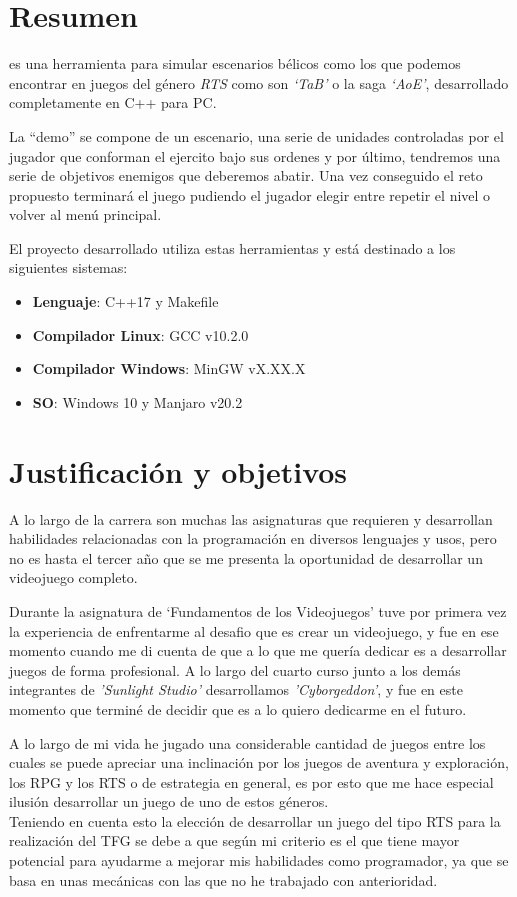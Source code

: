 \chapter*{Resumen}
\label{Resumen}

 es una herramienta para simular escenarios 
bélicos como los que podemos encontrar en juegos del género \textit{\ac{RTS}} como son
\textit{`\ac{TaB}'} o la saga \textit{`\ac{AoE}'}, desarrollado
completamente en C++ para \ac{PC}.

La ``demo'' se compone de un escenario, una serie de unidades controladas por el jugador
que conforman el ejercito bajo sus ordenes y por último, tendremos una serie de objetivos enemigos
que deberemos abatir. Una vez conseguido el reto propuesto terminará el juego pudiendo el jugador elegir 
entre repetir el nivel o volver al menú principal.

El proyecto desarrollado utiliza estas herramientas y está destinado a los siguientes
sistemas:
\begin{itemize}
	\item \textbf{Lenguaje}: C++17 y Makefile
	\item \textbf{Compilador Linux}: GCC v10.2.0
	\item \textbf{Compilador Windows}: MinGW vX.XX.X
	\item \textbf{SO}: Windows 10 y Manjaro v20.2
\end{itemize}

\chapter*{Justificación y objetivos}
A lo largo de la carrera son muchas las asignaturas que requieren y desarrollan
habilidades relacionadas con la programación en diversos lenguajes y usos, 
pero no es hasta el tercer año que se me presenta la oportunidad de desarrollar
un videojuego completo. 

Durante la asignatura de `Fundamentos de los Videojuegos' tuve por primera vez
la experiencia de enfrentarme al desafio que es crear un videojuego, y fue en ese
momento cuando me di cuenta de que a lo que me quería dedicar es a
desarrollar juegos de forma profesional. A lo largo del cuarto curso junto a los demás
integrantes de \textit{'Sunlight Studio'} desarrollamos \textit{'Cyborgeddon'}, y fue
en este momento que terminé de decidir que es a lo quiero dedicarme en el futuro.

A lo largo de mi vida he jugado una considerable cantidad de juegos entre los cuales
se puede apreciar una inclinación por los juegos de aventura y exploración, los 
\ac{RPG} y los \ac{RTS} o de estrategia en general, es por esto que me hace especial
ilusión desarrollar un juego de uno de estos géneros.\\
Teniendo en cuenta esto la elección de desarrollar un juego del tipo \ac{RTS} para la
realización del \ac{TFG} se debe a que según mi criterio es el que tiene mayor
potencial para ayudarme a mejorar mis habilidades como programador, ya que se basa en
unas mecánicas con las que no he trabajado con anterioridad.

